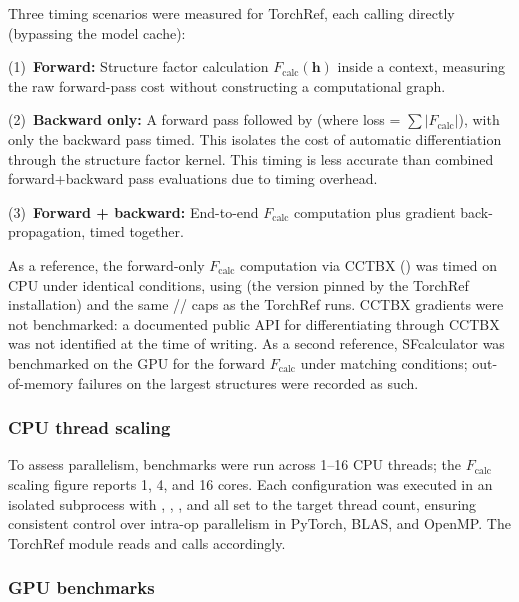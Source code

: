 \documentclass{iucrjournals}
\begin{document}
Three timing scenarios were measured for TorchRef, each calling
 directly (bypassing the model cache):

(1)~\textbf{Forward:}
Structure factor calculation $F_\mathrm{calc}(\mathbf{h})$ inside a
 context, measuring the raw forward-pass cost without
constructing a computational graph.

(2)~\textbf{Backward only:}
A forward pass followed by  (where
loss = $\sum |F_\mathrm{calc}|$), with only the backward pass timed.
This isolates the cost of automatic differentiation through the structure
factor kernel.
This timing is less accurate than combined forward+backward pass evaluations
due to timing overhead.

(3)~\textbf{Forward + backward:}
End-to-end $F_\mathrm{calc}$ computation plus gradient back-propagation, timed
together.

As a reference, the forward-only $F_\mathrm{calc}$ computation via CCTBX
() was timed on
CPU under identical conditions, using
 (the version pinned by the TorchRef installation) and
the same //%
 caps as the TorchRef runs.
CCTBX gradients were not benchmarked: a documented public API for
differentiating  through CCTBX was not identified at the
time of writing.
As a second reference, SFcalculator \cite{Li2025.01.12.632630} was benchmarked
on the GPU for the forward $F_\mathrm{calc}$ under matching conditions;
out-of-memory failures on the largest structures were recorded as such.

\subsubsection{CPU thread scaling}

To assess parallelism, benchmarks were run across 1--16 CPU threads; the
$F_\mathrm{calc}$ scaling figure reports 1, 4, and 16 cores.
Each configuration was executed in an isolated subprocess with
, ,
, and  all set to the
target thread count, ensuring consistent control over intra-op parallelism in
PyTorch, BLAS, and OpenMP.
The TorchRef  module reads 
and calls  accordingly.

\subsubsection{GPU benchmarks}
\end{document}
